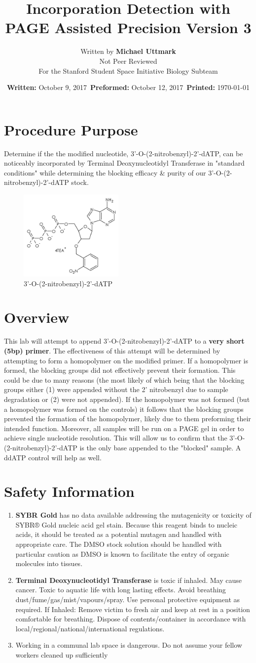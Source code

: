 \documentclass[letterpaper]{article}
\title{\BdATP{} Incorporation Detection with PAGE Assisted Precision Version 3} %
\author{Written by \textbf{Michael Uttmark}\\ %
		Not Peer Reviewed\\%
        For the Stanford Student Space Initiative Biology Subteam}
\date{\textbf{Written:} October 9, 2017 \,\textbf{Preformed:} October 12, 2017 \,\textbf{Printed:} \today{}}
\newenvironment{safety}{%
\begin{tcolorbox}[width=\textwidth, colframe=safetyFrame, arc=1.5mm]
}%
{\end{tcolorbox}}
\newcommand{\tdt}{Terminal Deoxynucleotidyl Transferase}
\newcommand{\BdATP}{3'-O-(2-nitrobenzyl)-2'-dATP}
\newcommand{\B}[1]{\textbf{#1}}
\newcommand{\SYBRGOLD}{\item{\B{SYBR Gold} has no data available addressing the mutagenicity or toxicity of SYBR® Gold nucleic acid gel stain. Because this reagent binds to nucleic acids, it should be treated as a potential mutagen and handled with appropriate care. The DMSO stock solution should be handled with particular caution as DMSO is known to facilitate the entry of organic molecules into tissues.\cite{sybrGold}}}
\newcommand{\tdtSafety}{\item{\textbf{\tdt{}} is toxic if inhaled. May cause cancer. Toxic to aquatic life with long lasting effects. Avoid breathing dust/fume/gas/mist/vapours/spray. Use personal protective equipment as required. If Inhaled: Remove victim to fresh air and keep at rest in a position comfortable for breathing. Dispose of contents/container in accordance with local/regional/national/international regulations.\cite{Invitrogen2002}}}
\begin{document}
\maketitle
\section{Procedure Purpose} %
Determine if the the modified nucleotide, \BdATP{}, can be noticeably incorporated by \tdt{} in "standard conditions" while determining the blocking efficacy \& purity of our \BdATP{} stock.
\begin{figure}[ht]
\centering
\includegraphics[width=2in]{1.png}
\caption{\BdATP{}}
\label{bdatp}
\end{figure}
\section{Overview} %
This lab will attempt to append \BdATP{} to a \textbf{very short (5bp) primer}. The effectiveness of this attempt will be determined by attempting to form a homopolymer on the modified primer. If a homopolymer is formed, the blocking groups did not effectively prevent their formation. This could be due to many reasons (the most likely of which being that the blocking groups either (1) were appended without the 2' nitrobenzyl due to sample degradation or (2) were not appended). If the homopolymer was not formed (but a homopolymer was formed on the controls) it follows that the blocking groups prevented the formation of the homopolymer, likely due to them preforming their intended function. Moreover, all samples will be run on a PAGE gel in order to achieve single nucleotide resolution. This will allow us to confirm that the \BdATP{} is the only base appended to the "blocked" sample. A ddATP control will help as well.

\section{Safety Information}
\begin{safety}
\begin{enumerate}
\SYBRGOLD{} %
\tdtSafety{}
\item{Working in a communal lab space is dangerous. Do not assume your fellow workers cleaned up sufficiently}
\end{enumerate}
\end{safety}
\end{document}
